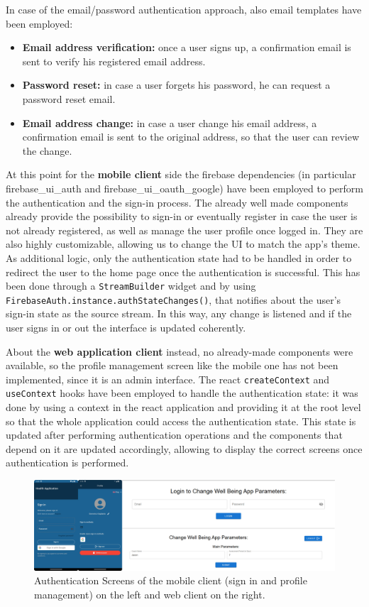 \noindent In case of the email/password authentication approach, also email templates have been employed:
\begin{itemize}[nosep] %
    \item \textbf{Email address verification:} once a user signs up, a confirmation email is sent to verify his registered email address.
    \item \textbf{Password reset:} in case a user forgets his password, he can request a password reset email.
    \item \textbf{Email address change:} in case a user change his email address, a confirmation email is sent to the original address, so that the user can review the change.
\end{itemize}
\newpage
\noindent At this point for the \textbf{mobile client} side the firebase dependencies (in particular firebase\_ui\_auth and firebase\_ui\_oauth\_google) have been employed to perform the authentication and the sign-in process. The already well made components already provide the possibility to sign-in or eventually register in case the user is not already registered, as well as manage the user profile once logged in. They are also highly customizable, allowing us to change the UI to match the app's theme. As additional logic, only the authentication state had to be handled in order to redirect the user to the home page once the authentication is successful. This has been done through a \texttt{StreamBuilder} widget and by using \texttt{FirebaseAuth.instance.authStateChanges()}, that notifies about the user's sign-in state as the source stream. In this way, any change is listened and if the user signs in or out the interface is updated coherently.

\noindent About the \textbf{web application client} instead, no already-made components were available, so the profile management screen like the mobile one has not been implemented, since it is an admin interface. The react \texttt{createContext} and \texttt{useContext} hooks have been employed to handle the authentication state: it was done by using a context in the react application and providing it at the root level so that the whole application could access the authentication state. This state is updated after performing authentication operations and the components that depend on it are updated accordingly, allowing to display the correct screens once authentication is performed.   

\begin{figure}
    \includegraphics[width=1.0\linewidth]{./images/authenticationScreens.jpg}
    \caption{Authentication Screens of the mobile client (sign in and profile management) on the left and web client on the right.}
\end{figure}
\newpage

